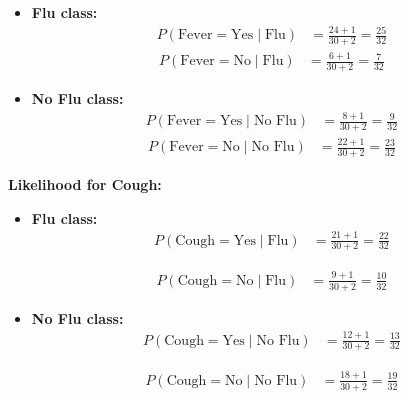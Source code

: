\documentclass[a4paper,12pt]{article}
\begin{document}
\begin{itemize}
  \item \textbf{Flu class:}
  \begin{align*}
    P(\text{Fever} = \text{Yes} \mid \text{Flu}) &= \frac{24 + 1}{30 + 2} = \frac{25}{32} 
      \end{align*}
      \begin{align*}
    P(\text{Fever} = \text{No} \mid \text{Flu}) &= \frac{6 + 1}{30 + 2} = \frac{7}{32}
  \end{align*}

\vspace{.5cm}

  \item \textbf{No Flu class:}
  \begin{align*}
    P(\text{Fever} = \text{Yes} \mid \text{No Flu}) &= \frac{8 + 1}{30 + 2} = \frac{9}{32} 
      \end{align*}
      \begin{align*}
    P(\text{Fever} = \text{No} \mid \text{No Flu}) &= \frac{22 + 1}{30 + 2} = \frac{23}{32}
  \end{align*}
\end{itemize}

\vspace{1em}
\textbf{Likelihood for Cough:}

\vspace{0.5cm}

\begin{itemize}
  \item \textbf{Flu class:}
  \begin{align*}
    P(\text{Cough} = \text{Yes} \mid \text{Flu}) &= \frac{21 + 1}{30 + 2} = \frac{22}{32} 
    \end{align*}
    
    \begin{align*}
    P(\text{Cough} = \text{No} \mid \text{Flu}) &= \frac{9 + 1}{30 + 2} = \frac{10}{32}
  \end{align*}

  \item \textbf{No Flu class:}
  \begin{align*}
    P(\text{Cough} = \text{Yes} \mid \text{No Flu}) &= \frac{12 + 1}{30 + 2} = \frac{13}{32} 
   \end{align*}
   
    \begin{align*}
    P(\text{Cough} = \text{No} \mid \text{No Flu}) &= \frac{18 + 1}{30 + 2} = \frac{19}{32}
  \end{align*}
\end{itemize}
\end{document}
